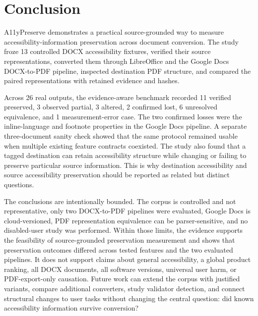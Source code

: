 \section{Conclusion}
\label{sec:conclusion}

A11yPreserve demonstrates a practical source-grounded way to measure accessibility-information preservation across document conversion. The study froze 13 controlled DOCX accessibility fixtures, verified their source representations, converted them through LibreOffice and the Google Docs DOCX-to-PDF pipeline, inspected destination PDF structure, and compared the paired representations with retained evidence and hashes.

Across 26 real outputs, the evidence-aware benchmark recorded 11 verified preserved, 3 observed partial, 3 altered, 2 confirmed lost, 6 unresolved equivalence, and 1 measurement-error case. The two confirmed losses were the inline-language and footnote properties in the Google Docs pipeline. A separate three-document sanity check showed that the same protocol remained usable when multiple existing feature contracts coexisted. The study also found that a tagged destination can retain accessibility structure while changing or failing to preserve particular source information. This is why destination accessibility and source accessibility preservation should be reported as related but distinct questions.

The conclusions are intentionally bounded. The corpus is controlled and not representative, only two DOCX-to-PDF pipelines were evaluated, Google Docs is cloud-versioned, PDF representation equivalence can be parser-sensitive, and no disabled-user study was performed. Within those limits, the evidence supports the feasibility of source-grounded preservation measurement and shows that preservation outcomes differed across tested features and the two evaluated pipelines. It does not support claims about general accessibility, a global product ranking, all DOCX documents, all software versions, universal user harm, or PDF-export-only causation. Future work can extend the corpus with justified variants, compare additional converters, study validator detection, and connect structural changes to user tasks without changing the central question: did known accessibility information survive conversion?


